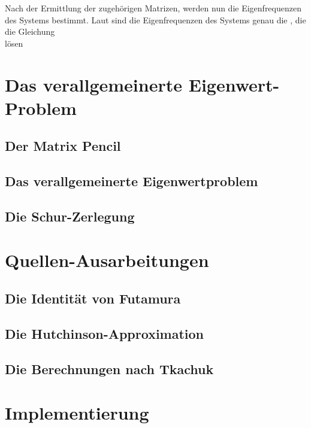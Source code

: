 \documentclass[ngerman,BCOR=4mm]{tudscrreprt}
\theoremstyle{plain} %
\theoremstyle{definition} %
\theoremstyle{remark}
\begin{document}
            Nach der Ermittlung der zugehörigen Matrizen, werden nun die Eigenfrequenzen des Systems bestimmt.
            Laut \cite[text]{maschinendynamikDresig} sind die Eigenfrequenzen des Systems genau die \w, die die Gleichung
            \begin{equation}
                  \label{eqn: verallg EW Problem mit w}
            \end{equation}
            lösen%

            

\chapter{Das verallgemeinerte Eigenwert-Problem}
\label{sec: EW Problem}
      \section{Der Matrix Pencil}

      \section{Das verallgemeinerte Eigenwertproblem}

      \section{Die Schur-Zerlegung}

\chapter{Quellen-Ausarbeitungen}
\label{sec: Quellen}
      \section{Die Identität von Futamura}

      \section{Die Hutchinson-Approximation}

      \section{Die Berechnungen nach Tkachuk}

\chapter{Implementierung}
\label{sec: Programmieren}
\end{document}
